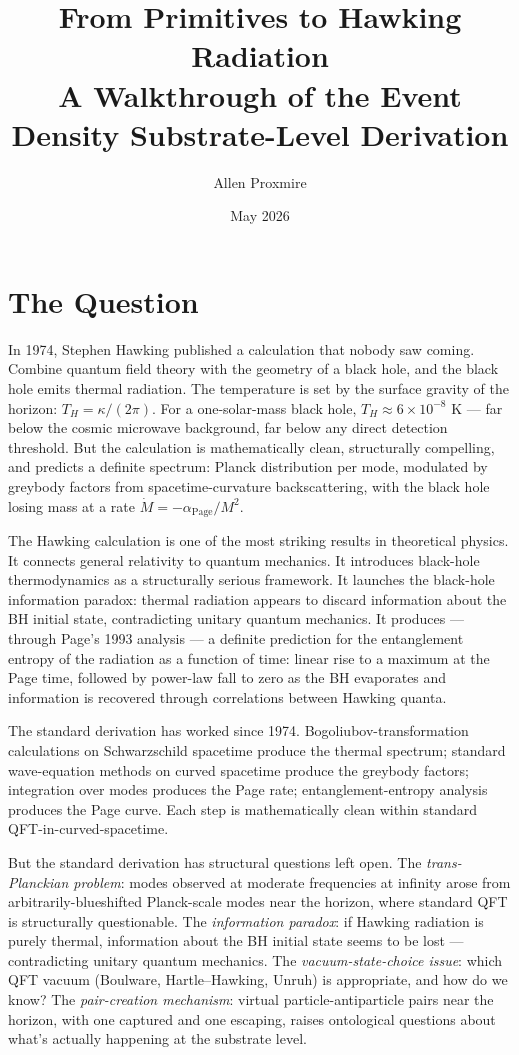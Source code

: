 \documentclass[11pt,a4paper]{article}
\title{\vspace{-1cm}\Large\bfseries From Primitives to Hawking Radiation\\[6pt]
\large\mdseries A Walkthrough of the Event Density Substrate-Level Derivation}
\author{Allen Proxmire}
\date{May 2026}
\begin{document}
\maketitle
\thispagestyle{empty}

\section{The Question}

In 1974, Stephen Hawking published a calculation that nobody saw coming. Combine quantum field theory with the geometry of a black hole, and the black hole emits thermal radiation. The temperature is set by the surface gravity of the horizon: $T_H = \kappa/(2\pi)$. For a one-solar-mass black hole, $T_H \approx 6 \times 10^{-8}$ K --- far below the cosmic microwave background, far below any direct detection threshold. But the calculation is mathematically clean, structurally compelling, and predicts a definite spectrum: Planck distribution per mode, modulated by greybody factors from spacetime-curvature backscattering, with the black hole losing mass at a rate $\dot M = -\alpha_{\mathrm{Page}}/M^2$.

The Hawking calculation is one of the most striking results in theoretical physics. It connects general relativity to quantum mechanics. It introduces black-hole thermodynamics as a structurally serious framework. It launches the black-hole information paradox: thermal radiation appears to discard information about the BH initial state, contradicting unitary quantum mechanics. It produces --- through Page's 1993 analysis --- a definite prediction for the entanglement entropy of the radiation as a function of time: linear rise to a maximum at the Page time, followed by power-law fall to zero as the BH evaporates and information is recovered through correlations between Hawking quanta.

The standard derivation has worked since 1974. Bogoliubov-transformation calculations on Schwarzschild spacetime produce the thermal spectrum; standard wave-equation methods on curved spacetime produce the greybody factors; integration over modes produces the Page rate; entanglement-entropy analysis produces the Page curve. Each step is mathematically clean within standard QFT-in-curved-spacetime.

But the standard derivation has structural questions left open. The \emph{trans-Planckian problem}: modes observed at moderate frequencies at infinity arose from arbitrarily-blueshifted Planck-scale modes near the horizon, where standard QFT is structurally questionable. The \emph{information paradox}: if Hawking radiation is purely thermal, information about the BH initial state seems to be lost --- contradicting unitary quantum mechanics. The \emph{vacuum-state-choice issue}: which QFT vacuum (Boulware, Hartle--Hawking, Unruh) is appropriate, and how do we know? The \emph{pair-creation mechanism}: virtual particle-antiparticle pairs near the horizon, with one captured and one escaping, raises ontological questions about what's actually happening at the substrate level.
\end{document}
